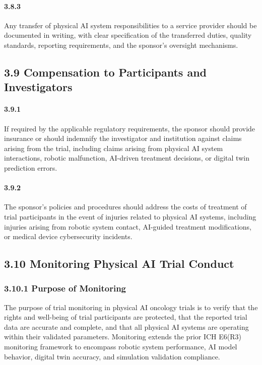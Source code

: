 \documentclass[11pt]{article}
\begin{document}
\paragraph{3.8.3} Any transfer of physical AI system responsibilities to a service provider should be documented in writing, with clear specification of the transferred duties, quality standards, reporting requirements, and the sponsor's oversight mechanisms.

\subsection{3.9 Compensation to Participants and Investigators}

\paragraph{3.9.1} If required by the applicable regulatory requirements, the sponsor should provide insurance or should indemnify the investigator and institution against claims arising from the trial, including claims arising from physical AI system interactions, robotic malfunction, AI-driven treatment decisions, or digital twin prediction errors.

\paragraph{3.9.2} The sponsor's policies and procedures should address the costs of treatment of trial participants in the event of injuries related to physical AI systems, including injuries arising from robotic system contact, AI-guided treatment modifications, or medical device cybersecurity incidents.

\subsection{3.10 Monitoring Physical AI Trial Conduct}

\subsubsection{3.10.1 Purpose of Monitoring}

The purpose of trial monitoring in physical AI oncology trials is to verify that the rights and well-being of trial participants are protected, that the reported trial data are accurate and complete, and that all physical AI systems are operating within their validated parameters. Monitoring extends the prior ICH E6(R3) monitoring framework to encompass robotic system performance, AI model behavior, digital twin accuracy, and simulation validation compliance.
\end{document}
